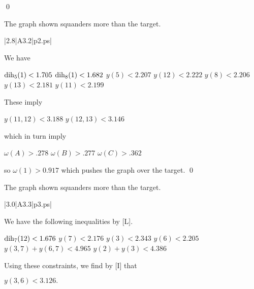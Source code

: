 \qed



\bigskip



 The graph shown 
squanders more than the target.  \endproclaim

\gram|2.8|A3.2|p2.ps|  %

We have 

$\operatorname{dih}_5(1) < 1.705$ \newline
$\operatorname{dih}_8(1) < 1.682$ \newline
$y(5)<2.207$ \newline
$y(12)<2.222$ \newline
$y(8)<2.206$ \newline
$y(13)<2.181$ \newline
$y(11)<2.199$ \newline

These imply 

$y(11,12)<3.188$ \newline
$y(12,13)<3.146$ \newline

which in turn imply

$\omega(A)>.278$ \newline
$\omega(B)>.277$ \newline
$\omega(C)>.362$ \newline

so $\omega(1)>0.917$ which pushes the graph over the target. \qed



\bigskip



 The graph shown 
squanders more than the target.  \endproclaim

\gram|3.0|A3.3|p3.ps|  %


We have the following inequalities by [L].

$\operatorname{dih}_7(12) < 1.676$ \newline
$y(7) < 2.176$ \newline
$y(3) < 2.343$ \newline
$y(6) < 2.205$ \newline
$y(3,7)+y(6,7) < 4.965$ \newline
$y(2) + y(3) < 4.386$ \newline

Using these constraints, we find by [I] that

$y(3,6)<3.126.$

